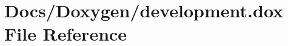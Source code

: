 \hypertarget{development_8dox}{}\section{Docs/\+Doxygen/development.dox File Reference}
\label{development_8dox}
